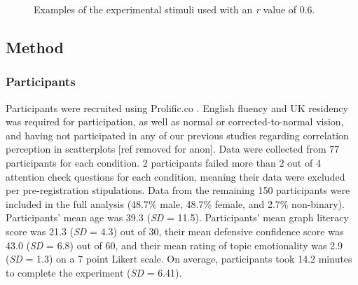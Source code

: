 \documentclass[manuscript,screen,review]{acmart}
\begin{document}
\begin{figure}


\caption{\label{fig-main-examples}Examples of the experimental stimuli
used with an \textit{r} value of 0.6.}

\end{figure}%

\subsection{Method}\label{sec-method-main}

\subsubsection{Participants}\label{sec-participants-main}

Participants were recruited using Prolific.co \citep{prolific}. English
fluency and UK residency was required for participation, as well as
normal or corrected-to-normal vision, and having not participated in any
of our previous studies regarding correlation perception in scatterplots
{[}ref removed for anon{]}. Data were collected from 77 participants for
each condition. 2 participants failed more than 2 out of 4 attention
check questions for each condition, meaning their data were excluded per
pre-registration stipulations. Data from the remaining 150 participants
were included in the full analysis (48.7\% male, 48.7\% female, and
2.7\% non-binary). Participants' mean age was 39.3 (\emph{SD} = 11.5).
Participants' mean graph literacy score was 21.3 (\emph{SD} = 4.3) out
of 30, their mean defensive confidence score was 43.0 (\emph{SD} = 6.8)
out of 60, and their mean rating of topic emotionality was 2.9
(\emph{SD} = 1.3) on a 7 point Likert scale. On average, participants
took 14.2 minutes to complete the experiment (\emph{SD} = 6.41).
\end{document}
